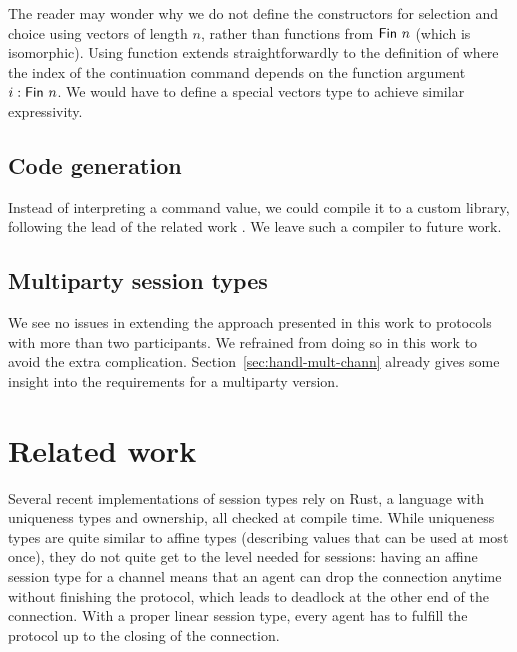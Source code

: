 \documentclass[acmsmall,screen,anonymous,review]{acmart}
\begin{document}
The reader may wonder why we do not define the constructors for
selection and choice using vectors of length $n$, rather than
functions from $\AFin~n$ (which is isomorphic). Using function extends
straightforwardly to the definition of {\ACommand} where the {\ASession} index of the
continuation command depends on the function argument $i : \AFin~n$.
We would have to define a special vectors type to achieve similar
expressivity. 

\subsection{Code generation}
\label{sec:code-generation}

Instead of interpreting a command value, we could compile it to a
custom library, following the lead of the related work
\cite{DBLP:journals/pacmpl/00020HNY20,DBLP:conf/cc/Miu0Y021}.
We leave such a compiler to future work.

\subsection{Multiparty session types}
\label{sec:mult-sess-types}

We see no issues in extending the approach presented in this work to
protocols with more than two participants. We refrained from doing so
in this work to avoid the extra
complication. Section~\ref{sec:handl-mult-chann} already gives some
insight into the requirements for a multiparty version.

\section{Related work}
\label{sec:related-work}



Several recent implementations of session types rely on Rust, a
language with uniqueness types and ownership, all checked at compile
time. While uniqueness types are quite similar to affine types
(describing values that can be used at most once), they do not quite
get to the level needed for sessions: having an affine session type
for a channel means that an agent can drop the connection anytime
without finishing the protocol, which leads to deadlock at the other
end of the connection. With a proper linear session type, every agent has to
fulfill the protocol up to the closing of the connection.

\cite{DBLP:conf/ecoop/ChenBT22}
\cite{DBLP:conf/ecoop/LagaillardieNY22}
\cite{DBLP:conf/ppopp/CutnerYV22}
\cite{DBLP:conf/coordination/CutnerY21}
\cite{DBLP:conf/coordination/LagaillardieNY20}
\cite{DBLP:journals/corr/abs-1909-05970}
\cite{DBLP:conf/icfp/JespersenML15}
\end{document}
